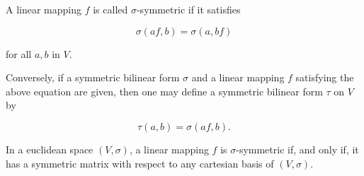 A linear mapping $f$ is called $\sigma$-symmetric if it satisfies

$$\sigma(af, b) = \sigma(a, bf)$$

for all $a, b$ in $V$.

Conversely, if a symmetric bilinear form $\sigma$ and a linear mapping $f$ satisfying the above equation are given, then one may define a symmetric bilinear form $\tau$ on $V$ by

$$\tau(a, b) = \sigma(af, b).$$

In a euclidean space $(V, \sigma)$, a linear mapping $f$ is $\sigma$-symmetric if, and only if, it has a symmetric matrix with respect to any cartesian basis of $(V, \sigma)$.
